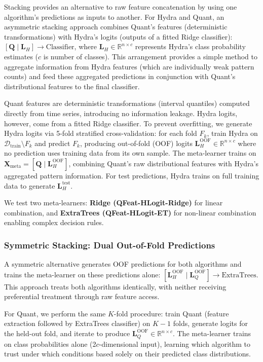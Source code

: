 \documentclass[pdflatex,sn-basic]{sn-jnl}           %
\theoremstyle{thmstyleone}%
\theoremstyle{thmstyletwo}%
\theoremstyle{thmstylethree}%
\begin{document}
Stacking \citep{stacked-generalization} provides an alternative to raw feature concatenation by using one algorithm's predictions as inputs to another. For Hydra and Quant, an asymmetric stacking approach combines Quant's features (deterministic transformations) with Hydra's logits (outputs of a fitted Ridge classifier): $[\mathbf{Q} \mid \mathbf{L}_H] \rightarrow \text{Classifier}$, where $\mathbf{L}_H \in \mathbb{R}^{n \times c}$ represents Hydra's class probability estimates ($c$ is number of classes). This arrangement provides a simple method to aggregate information from Hydra features (which are individually weak pattern counts) and feed these aggregated predictions in conjunction with Quant's distributional features to the final classifier.

Quant features are deterministic transformations (interval quantiles) computed directly from time series, introducing no information leakage. Hydra logits, however, come from a fitted Ridge classifier. To prevent overfitting, we generate Hydra logits via 5-fold stratified cross-validation: for each fold $F_k$, train Hydra on $\mathcal{D}_{\text{train}} \setminus F_k$ and predict $F_k$, producing out-of-fold (OOF) logits $\mathbf{L}_H^{\text{OOF}} \in \mathbb{R}^{n \times c}$ where no prediction uses training data from its own sample. The meta-learner trains on $\mathbf{X}_{\text{meta}} = [\mathbf{Q} \mid \mathbf{L}_H^{\text{OOF}}]$, combining Quant's raw distributional features with Hydra's aggregated pattern information. For test predictions, Hydra trains on full training data to generate $\mathbf{L}_H^{\text{test}}$.

We test two meta-learners: \textbf{Ridge (QFeat-HLogit-Ridge)} for linear combination, and \textbf{ExtraTrees (QFeat-HLogit-ET)} for non-linear combination enabling complex decision rules.

\subsubsection{Symmetric Stacking: Dual Out-of-Fold Predictions}

A symmetric alternative generates OOF predictions for both algorithms and trains the meta-learner on these predictions alone: $[\mathbf{L}_H^{\text{OOF}} \mid \mathbf{L}_Q^{\text{OOF}}] \rightarrow \text{ExtraTrees}$. This approach treats both algorithms identically, with neither receiving preferential treatment through raw feature access.

For Quant, we perform the same $K$-fold procedure: train Quant (feature extraction followed by ExtraTrees classifier) on $K-1$ folds, generate logits for the held-out fold, and iterate to produce $\mathbf{L}_Q^{\text{OOF}} \in \mathbb{R}^{n \times c}$. The meta-learner trains on class probabilities alone (2$c$-dimensional input), learning which algorithm to trust under which conditions based solely on their predicted class distributions.
\end{document}

